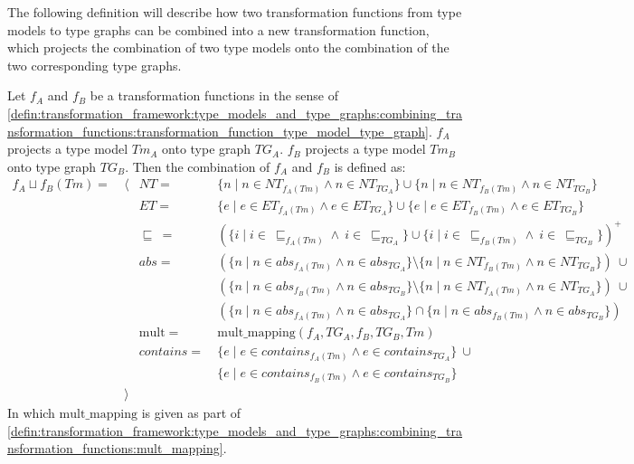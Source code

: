The following definition will describe how two transformation functions from type models to type graphs can be combined into a new transformation function, which projects the combination of two type models onto the combination of the two corresponding type graphs.

\begin{defin}
\label{defin:transformation_framework:type_models_and_type_graphs:combining_transformation_functions:combination_transformation_function_type_model_type_graph}
Let $f_A$ and $f_B$ be a transformation functions in the sense of \cref{defin:transformation_framework:type_models_and_type_graphs:combining_transformation_functions:transformation_function_type_model_type_graph}. $f_A$ projects a type model $Tm_A$ onto type graph $TG_A$. $f_B$ projects a type model $Tm_B$ onto type graph $TG_B$. Then the combination of $f_A$ and $f_B$ is defined as:
\begin{align*}
f_{A} \sqcup f_{B}(Tm) =\ &\langle&
NT =\ &\{n \mid n \in NT_{f_{A}(Tm)} \land n \in NT_{TG_A} \} \cup \{n \mid n \in NT_{f_{B}(Tm)} \land n \in NT_{TG_B} \} \\&&
ET =\ &\{e \mid e \in ET_{f_{A}(Tm)} \land e \in ET_{TG_A} \} \cup \{e \mid e \in ET_{f_{B}(Tm)} \land e \in ET_{TG_B} \} \\&&
\!\!\sqsubseteq\ =\ &(\{i \mid i \in\ \sqsubseteq_{f_{A}(Tm)} \land\ i \in\ \sqsubseteq_{TG_A} \} \cup \{i \mid i \in\ \sqsubseteq_{f_{B}(Tm)} \land\ i \in\ \sqsubseteq_{TG_B} \})^+ \\&&
abs =\ &(\{n \mid n \in abs_{f_{A}(Tm)} \land n \in abs_{TG_A} \} \setminus \{n \mid n \in NT_{f_{B}(Tm)} \land n \in NT_{TG_B} \})\ \cup\\&&&
(\{n \mid n \in abs_{f_{B}(Tm)} \land n \in abs_{TG_B} \} \setminus \{n \mid n \in NT_{f_{A}(Tm)} \land n \in NT_{TG_A} \})\ \cup\\&&&
(\{n \mid n \in abs_{f_{A}(Tm)} \land n \in abs_{TG_A} \} \cap \{n \mid n \in abs_{f_{B}(Tm)} \land n \in abs_{TG_B} \}) \\&&
\mathrm{mult} =\ &\mathrm{mult\_\!mapping}(f_A, TG_A, f_B, TG_B, Tm) \\&&
contains =\ &\{e \mid e \in contains_{f_{A}(Tm)} \land e \in contains_{TG_A} \}\ \cup\\&&&
\{e \mid e \in contains_{f_{B}(Tm)} \land e \in contains_{TG_B} \} \\&
\rangle
\end{align*}
In which $\mathrm{mult\_\!mapping}$ is given as part of \cref{defin:transformation_framework:type_models_and_type_graphs:combining_transformation_functions:mult_mapping}.
\end{defin}

